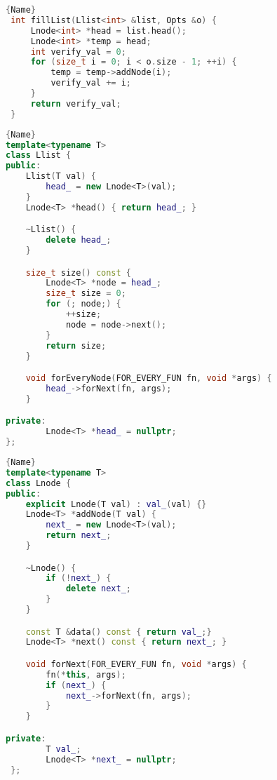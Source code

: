 \clearpage
{}
\begin{spacing}{1.1}
\begin{lstlisting}[language=C++, caption={\en{Linked List Traversal: fillList()}}, frame=tb]{Name}
 int fillList(Llist<int> &list, Opts &o) {
     Lnode<int> *head = list.head();
     Lnode<int> *temp = head;
     int verify_val = 0;
     for (size_t i = 0; i < o.size - 1; ++i) {
         temp = temp->addNode(i);
         verify_val += i;
     }
     return verify_val;
 }

\end{lstlisting}
\end{spacing}


\begin{spacing}{0.9}
\begin{lstlisting}[language=C++, caption={\en{Linked List Traversal: Llist}}, frame=tb]{Name}
template<typename T>
class Llist {
public:
    Llist(T val) {
        head_ = new Lnode<T>(val);
    }
    Lnode<T> *head() { return head_; }

    ~Llist() {
        delete head_;
    }

    size_t size() const {
        Lnode<T> *node = head_;
        size_t size = 0;
        for (; node;) {
            ++size;
            node = node->next();
        }
        return size;
    }

    void forEveryNode(FOR_EVERY_FUN fn, void *args) {
        head_->forNext(fn, args);
    }

private:
        Lnode<T> *head_ = nullptr;
};

\end{lstlisting}
\end{spacing}
\clearpage
{}
\begin{spacing}{1}
\begin{lstlisting}[language=C++, caption={\en{Linked List Traversal: Lnode}}, frame=tb]{Name}
template<typename T>
class Lnode {
public:
    explicit Lnode(T val) : val_(val) {}
    Lnode<T> *addNode(T val) {
        next_ = new Lnode<T>(val);
        return next_;
    }

    ~Lnode() {
        if (!next_) {
            delete next_;
        }
    }

    const T &data() const { return val_;}
    Lnode<T> *next() const { return next_; }

    void forNext(FOR_EVERY_FUN fn, void *args) {
        fn(*this, args);
        if (next_) {
            next_->forNext(fn, args);
        }
    }

private:
        T val_;
        Lnode<T> *next_ = nullptr;
 };

\end{lstlisting}
\end{spacing}


